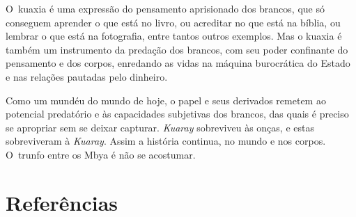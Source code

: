 O~kuaxia é uma expressão do pensamento aprisionado dos brancos, que só
conseguem aprender o que está no livro, ou acreditar no que está na
bíblia, ou lembrar o que está na fotografia, entre tantos outros
exemplos. Mas o kuaxia é também um instrumento da predação dos brancos,
com seu poder confinante do pensamento e dos corpos, enredando as vidas
na máquina burocrática do Estado e nas relações pautadas pelo dinheiro.


Como um mundéu do mundo de hoje, o papel e seus derivados remetem ao
potencial predatório e às capacidades subjetivas dos brancos, das quais
é preciso se apropriar sem se deixar capturar. \emph{Kuaray} sobreviveu às
onças, e estas sobreviveram à \emph{Kuaray}. Assim a história continua, no
mundo e nos corpos. O~trunfo entre os Mbya é não se acostumar.

\section{Referências} 


